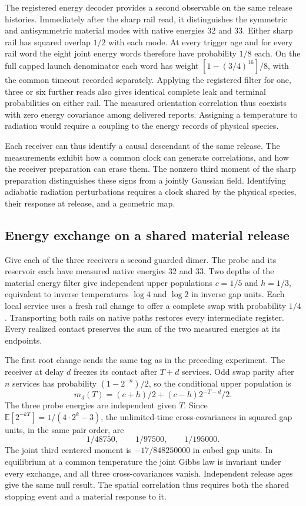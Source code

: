 \documentclass[11pt]{article}
\theoremstyle{remark}
\begin{document}
The registered energy decoder provides a second observable on the same
release histories. Immediately after the sharp rail read, it distinguishes
the symmetric and antisymmetric material modes with native energies 32 and
33. Either sharp rail has squared overlap \(1/2\) with each mode. At every
trigger age and for every rail word the eight joint energy words therefore
have probability \(1/8\) each. On the full capped launch denominator each
word has weight \([1-(3/4)^{16}]/8\), with the common timeout recorded
separately. Applying the registered filter for one, three or six further
reads also gives identical complete leak and terminal probabilities on
either rail. The measured orientation correlation thus coexists with zero
energy covariance among delivered reports. Assigning a temperature to
radiation would require a coupling to the energy records of physical species.

Each receiver can thus identify a causal descendant of the same release.
The measurements exhibit how a common clock can generate correlations, and
how the receiver preparation can erase them. The nonzero third moment of
the sharp preparation distinguishes these signs from a jointly Gaussian
field. Identifying adiabatic radiation perturbations requires a clock shared
by the physical species, their response at release, and a geometric map.

\subsection{Energy exchange on a shared material release}

Give each of the three receivers a second guarded dimer. The probe and
its reservoir each have measured native energies 32 and 33. Two depths of
the material energy filter give independent upper populations
\(c=1/5\) and \(h=1/3\), equivalent to inverse temperatures \(\log 4\)
and \(\log 2\) in inverse gap units. Each local service uses a fresh rail
change to offer a complete swap with probability \(1/4\).
Transporting both rails on native paths restores every intermediate
register. Every realized contact preserves the sum of the two measured
energies at its endpoints.

The first root change sends the same tag as in the preceding experiment.
The receiver at delay \(d\) freezes its contact after \(T+d\) services.
Odd swap parity after \(n\) services has probability \((1-2^{-n})/2\),
so the conditional upper population is
\[
 m_d(T)=(c+h)/2+(c-h)2^{-T-d}/2 .
\]
The three probe energies are independent given \(T\). Since
\(\mathbb E[2^{-kT}]=1/(4\cdot 2^k-3)\), the unlimited-time
cross-covariances in squared gap units, in the same pair order, are
\[
 1/48750,\qquad 1/97500,\qquad 1/195000 .
\]
The joint third centered moment is \(-17/848250000\) in cubed gap units.
In equilibrium at a common temperature the joint Gibbs law is invariant
under every exchange, and all three cross-covariances vanish. Independent
release ages give the same null result. The spatial correlation thus
requires both the shared stopping event and a material response to it.
\end{document}
